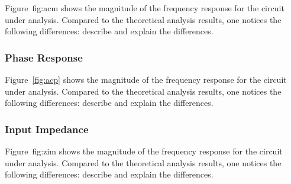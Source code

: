 Figure~{fig:acm} shows the magnitude of the frequency response for the
circuit under analysis. Compared to the theoretical analysis results, one
notices the following differences: describe and explain the differences.


\lipsum[1-1]

\subsubsection{Phase Response}

Figure~\ref{fig:acp} shows the magnitude of the frequency response for the
circuit under analysis. Compared to the theoretical analysis results, one
notices the following differences: describe and explain the differences.


\lipsum[1-1]

\subsubsection{Input Impedance}

Figure~{fig:zim} shows the magnitude of the frequency response for the
circuit under analysis. Compared to the theoretical analysis results, one
notices the following differences: describe and explain the differences.


\lipsum[1-1]



